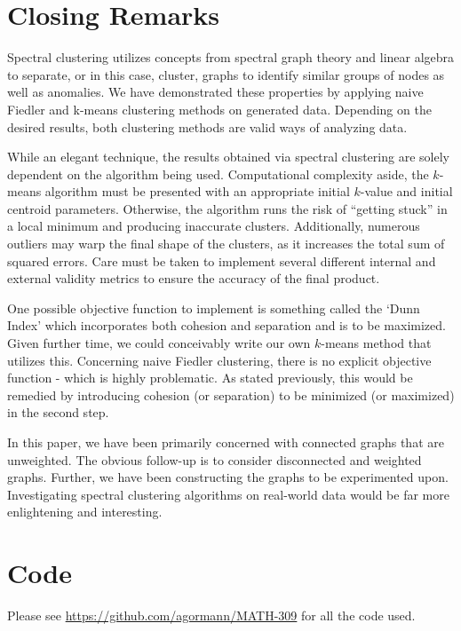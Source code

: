 \documentclass[11pt, letterpaper]{article}
\theoremstyle{perchance}
\begin{document}
\section{Closing Remarks}\label{sec:conc}

    Spectral clustering utilizes concepts from spectral graph theory and linear algebra to separate, or in this case, cluster, graphs to identify similar groups of nodes as well as anomalies. We have demonstrated these properties by applying naive Fiedler and k-means clustering methods on generated data. Depending on the desired results, both clustering methods are valid ways of analyzing data.
    
    While an elegant technique, the results obtained via spectral clustering are solely dependent on the algorithm being used. Computational complexity aside, the $k$-means algorithm must be presented with an appropriate initial $k$-value and initial centroid parameters. Otherwise, the algorithm runs the risk of ``getting stuck'' in a local minimum and producing inaccurate clusters. Additionally, numerous outliers may warp the final shape of the clusters, as it increases the total sum of squared errors. Care must be taken to implement several different internal and external validity metrics to ensure the accuracy of the final product. 
    
    One possible objective function to implement is something called the `Dunn Index' which incorporates both cohesion and separation and is to be maximized. Given further time, we could conceivably write our own $k$-means method that utilizes this. Concerning naive Fiedler clustering, there is no explicit objective function - which is highly problematic. As stated previously, this would be remedied by introducing cohesion (or separation) to be minimized (or maximized) in the second step.

    In this paper, we have been primarily concerned with connected graphs that are unweighted. The obvious follow-up is to consider disconnected and weighted graphs. Further, we have been constructing the graphs to be experimented upon. Investigating spectral clustering algorithms on real-world data would be far more enlightening and interesting.

\section{Code}\label{sec:code}

    Please see \url{https://github.com/agormann/MATH-309} for all the code used.

\printbibliography
\end{document}
